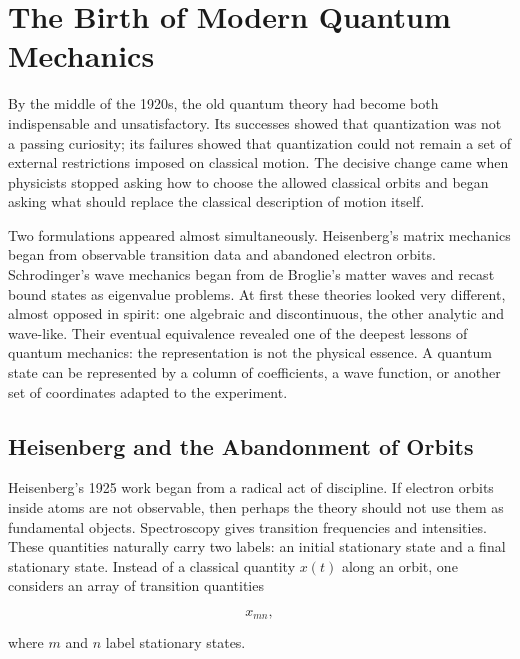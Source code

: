 \section{The Birth of Modern Quantum Mechanics}
By the middle of the 1920s, the old quantum theory had become both indispensable and unsatisfactory. Its successes showed that quantization was not a passing curiosity; its failures showed that quantization could not remain a set of external restrictions imposed on classical motion. The decisive change came when physicists stopped asking how to choose the allowed classical orbits and began asking what should replace the classical description of motion itself.

Two formulations appeared almost simultaneously. Heisenberg's matrix mechanics began from observable transition data and abandoned electron orbits. Schrodinger's wave mechanics began from de Broglie's matter waves and recast bound states as eigenvalue problems. At first these theories looked very different, almost opposed in spirit: one algebraic and discontinuous, the other analytic and wave-like. Their eventual equivalence revealed one of the deepest lessons of quantum mechanics: the representation is not the physical essence. A quantum state can be represented by a column of coefficients, a wave function, or another set of coordinates adapted to the experiment.

\subsection{Heisenberg and the Abandonment of Orbits}
\label{subsec:matrix}
Heisenberg's 1925 work began from a radical act of discipline. If electron orbits inside atoms are not observable, then perhaps the theory should not use them as fundamental objects. Spectroscopy gives transition frequencies and intensities. These quantities naturally carry two labels: an initial stationary state and a final stationary state. Instead of a classical quantity $x(t)$ along an orbit, one considers an array of transition quantities
\begin{linenomath}
    \begin{equation}
        x_{mn},
    \end{equation}
\end{linenomath}
where $m$ and $n$ label stationary states.

